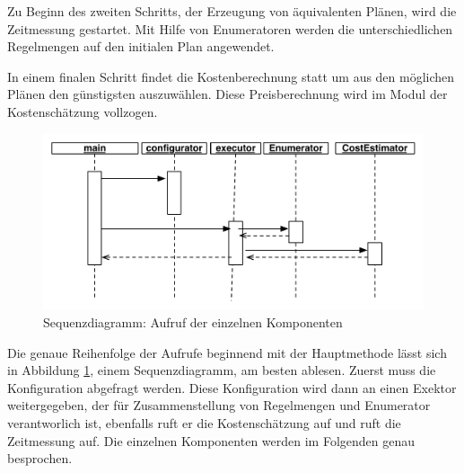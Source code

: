 Zu Beginn des zweiten Schritts, der Erzeugung von äquivalenten Plänen, wird die Zeitmessung gestartet.  Mit Hilfe von Enumeratoren werden die unterschiedlichen Regelmengen auf den initialen Plan angewendet.

In einem finalen Schritt findet die Kostenberechnung statt um aus den möglichen Plänen den günstigsten auszuwählen. Diese Preisberechnung wird im Modul der Kostenschätzung vollzogen.



\begin{figure}[ht]
  \centering
  \includegraphics[width=\textwidth]{04_Implementierung/00_media/SequenceDiagramConfiguration.pdf}
  \caption{Sequenzdiagramm: Aufruf der einzelnen Komponenten}
  \label{SequenceDiagramConfiguration}
\end{figure}


Die genaue Reihenfolge der Aufrufe beginnend mit der Hauptmethode lässt sich in Abbildung \ref{SequenceDiagramConfiguration}, einem Sequenzdiagramm, am besten ablesen. Zuerst muss die Konfiguration abgefragt werden. Diese Konfiguration wird dann an einen Exektor weitergegeben, der für Zusammenstellung von Regelmengen und Enumerator verantworlich ist, ebenfalls ruft er die Kostenschätzung auf und ruft die Zeitmessung auf. Die einzelnen Komponenten werden im Folgenden genau besprochen.
